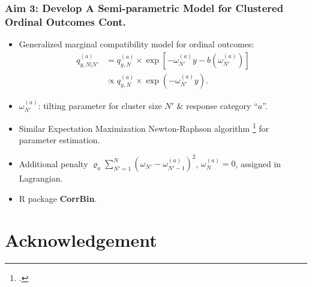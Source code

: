 \documentclass[hyperref={bookmarks=false},aspectratio=169]{beamer}
\begin{document}
\begin{frame}
\frametitle{Aim 3: Develop A Semi-parametric Model for Clustered Ordinal Outcomes Cont.}

\begin{itemize}
    \item \alert{Generalized marginal compatibility model for ordinal outcomes}:
    \begin{equation*}\label{M:GMCordinal_ExponentialTilting}
    \begin{split}
    q^{(a)}_{y,N|N'} &= q^{(a)}_{y,N} \times \exp{ \left[ - \omega^{(a)}_{N'} y - b \left( \omega^{(a)}_{N'} \right) \right]} \\
    & \propto q^{(a)}_{y,N} \times \exp{ \left( - \omega^{(a)}_{N'} y \right)} .
    \end{split}
    \end{equation*}
    \item $\omega^{(a)}_{N'}$: tilting parameter for cluster size $N'$ {\&} response category “$a$”.
    \item Similar Expectation Maximization Newton-Raphson algorithm \footcite{rathouz2008generalized} for parameter estimation.
    \item Additional penalty $\varrho_a \displaystyle\sum_{N'=1}^N (\omega_{N'} - \omega^{(a)}_{N'-1})^2$, $\omega^{(a)}_N=0$, assigned in Lagrangian.
    \item R package \textbf{CorrBin}.
\end{itemize}

\end{frame}



\begin{frame}[allowframebreaks]
     \printbibliography
 \end{frame}



\section{Acknowledgement}
\end{document}
